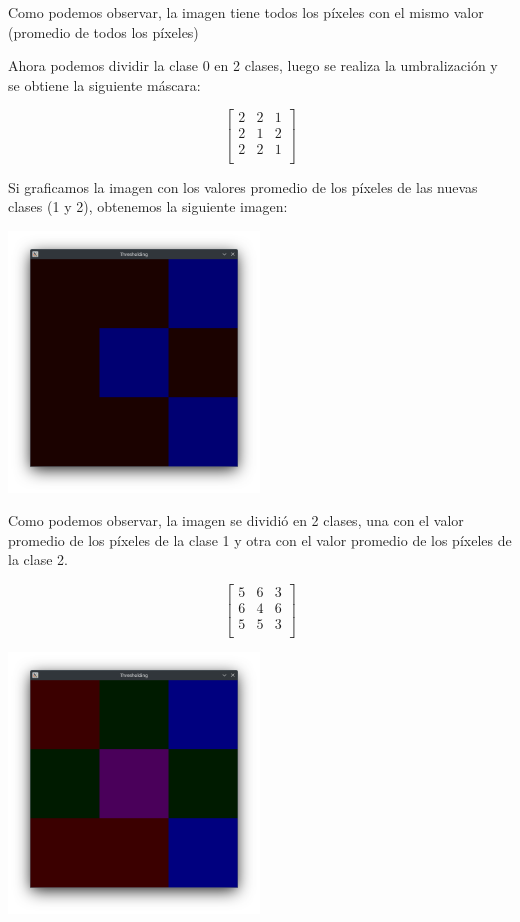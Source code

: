 Como podemos observar, la imagen tiene todos los píxeles con el mismo valor (promedio de todos los píxeles)

Ahora podemos dividir la clase 0 en 2 clases, luego se realiza la umbralización y se obtiene la siguiente máscara:

\begin{equation*}
    \begin{bmatrix}
        2 & 2 & 1 \\
        2 & 1 & 2 \\
        2 & 2 & 1 \\
    \end{bmatrix}
\end{equation*}

Si graficamos la imagen con los valores promedio de los píxeles de las nuevas clases (1 y 2), obtenemos la siguiente imagen:

\includegraphics[width=0.5\textwidth]{./latex/img/m1}

Como podemos observar, la imagen se dividió en 2 clases, una con el valor promedio de los píxeles de la clase 1 y otra con el valor promedio de los píxeles de la clase 2.

\begin{equation*}
    \begin{bmatrix}
        5 & 6 & 3 \\
        6 & 4 & 6 \\
        5 & 5 & 3 \\
    \end{bmatrix}
\end{equation*}


\includegraphics[width=0.5\textwidth]{./latex/img/m2}

